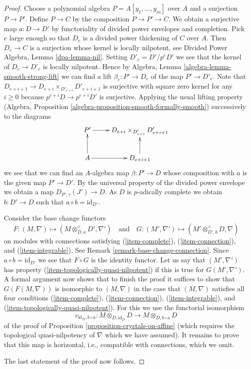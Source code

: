 \documentclass{stacks-project}
\theoremstyle{plain}
\theoremstyle{definition}
\theoremstyle{remark}
\numberwithin{equation}{subsection}
\begin{document}
\begin{proof}
Choose a polynomial algebra $P = A[y_1, \ldots, y_m]$ over $A$ and a
surjection $P \to P'$. Define $P \to C$ by the composition $P \to P' \to C$.
We obtain a surjective map $a : D \to D'$ by functoriality of
divided power envelopes and completion. Pick $e$ large enough so that
$D_e$ is a divided power
thickening of $C$ over $A$. Then $D_e \to C$ is a surjection whose kernel
is locally nilpotent, see Divided Power Algebra, Lemma \ref{dpa-lemma-nil}.
Setting $D'_e = D'/p^eD'$
we see that the kernel of $D_e \to D'_e$ is locally nilpotent.
Hence by Algebra, Lemma \ref{algebra-lemma-smooth-strong-lift}
we can find a lift $\beta_e : P' \to D_e$ of the map $P' \to D'_e$.
Note that $D_{e + i + 1} \to D_{e + i} \times_{D'_{e + i}} D'_{e + i + 1}$
is surjective with square zero kernel for any $i \geq 0$ because
$p^{e + i}D \to p^{e + i}D'$ is surjective. Applying the usual lifting
property (Algebra, Proposition \ref{algebra-proposition-smooth-formally-smooth})
successively to the diagrams
$$
\xymatrix{
P' \ar[r] & D_{e + i} \times_{D'_{e + i}} D'_{e + i + 1} \\
A \ar[u] \ar[r] & D_{e + i + 1} \ar[u]
}
$$
we see that we can find an $A$-algebra map $\beta : P' \to D$ whose
composition with $a$ is the given map $P' \to D'$.
By the universal property of the divided power envelope we obtain a
map $D_{P', \gamma}(J') \to D$. As $D$ is $p$-adically complete we
obtain $b : D' \to D$ such that $a \circ b = \text{id}_{D'}$.

\medskip\noindent
Consider the base change functors
$$
F : (M, \nabla) \longmapsto
(M \otimes^\wedge_{D, a} D', \nabla')
\quad\text{and}\quad
G : (M', \nabla') \longmapsto
(M' \otimes^\wedge_{D', b} D, \nabla)
$$
on modules with connections satisfying (\ref{item-complete}),
(\ref{item-connection}), and (\ref{item-integrable}).
See Remark \ref{remark-base-change-connection}.
Since $a \circ b = \text{id}_{D'}$ we see that
$F \circ G$ is the identity functor. Let us say that $(M', \nabla')$
has property (\ref{item-topologically-quasi-nilpotent}) if this
is true for $G(M', \nabla')$. A formal argument now shows that to finish
the proof it suffices to show that $G(F(M, \nabla))$ is isomorphic
to $(M, \nabla)$ in the case that $(M, \nabla)$ satisfies all four
conditions (\ref{item-complete}), (\ref{item-connection}),
(\ref{item-integrable}), and (\ref{item-topologically-quasi-nilpotent}).
For this we use the functorial isomorphism
$$
c_{\text{id}_D, b \circ a} :
M \otimes_{D, \text{id}_D} D
\longrightarrow
M \otimes_{D, b \circ a} D
$$
of the proof of Proposition \ref{proposition-crystals-on-affine}
(which requires the topological quasi-nilpotency of $\nabla$
which we have assumed).
It remains to prove that this map is horizontal, i.e.,
compatible with connections, which we omit.

\medskip\noindent
The last statement of the proof now follows.
\end{proof}
\end{document}
